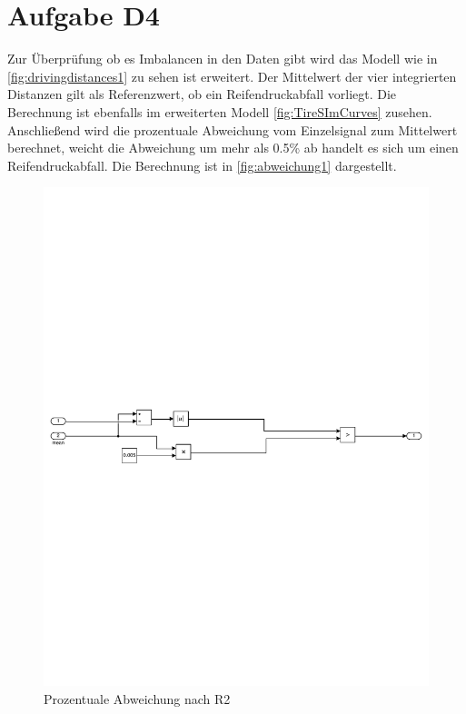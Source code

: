 \chapter{Aufgabe D4}

Zur Überprüfung ob es Imbalancen in den Daten gibt wird das Modell wie in \autoref{fig:drivingdistances1} zu sehen ist erweitert.
Der Mittelwert der vier integrierten Distanzen gilt als Referenzwert, ob ein Reifendruckabfall vorliegt. Die Berechnung ist ebenfalls im erweiterten Modell \autoref{fig:TireSImCurves} zusehen. Anschließend wird die prozentuale Abweichung vom Einzelsignal zum Mittelwert berechnet, weicht die Abweichung um mehr als 0.5\% ab handelt es sich um einen Reifendruckabfall. Die Berechnung ist in \autoref{fig:abweichung1} dargestellt. 
\vspace{-1em}
\begin{figure}[H]
	\centering
	\includegraphics[width=1\linewidth]{../Graphiken/PDFSplit/3_PDFsam_SebastianTireSim2.pdf}
	\caption{Prozentuale Abweichung nach R2}
	\label{fig:abweichung1}
\end{figure}
